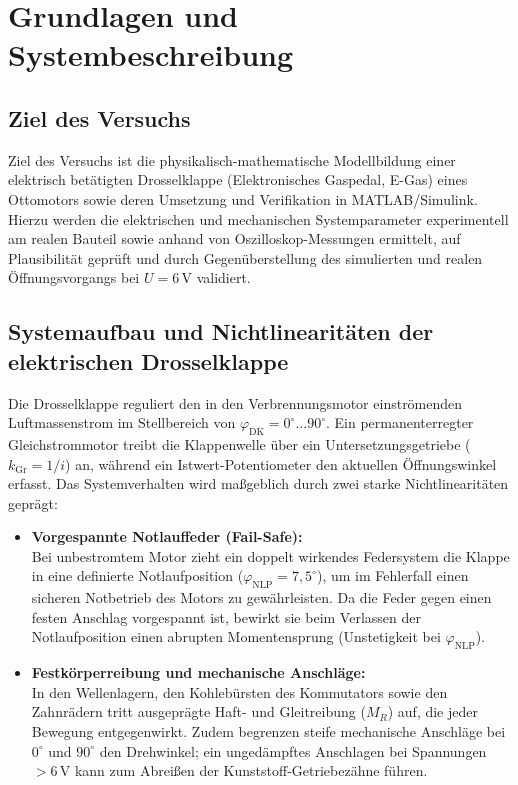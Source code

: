 \documentclass[a4paper,10pt,department=FakEI]{OTHRartcl}
\begin{document}
\vspace{5mm}

\begingroup
\hypersetup{linkcolor=black}
\tableofcontents
\endgroup

\clearpage

\section{Grundlagen und Systembeschreibung}
\subsection{Ziel des Versuchs}
Ziel des Versuchs ist die physikalisch-mathematische Modellbildung einer elektrisch betätigten Drosselklappe (Elektronisches Gaspedal, E-Gas) eines Ottomotors sowie deren Umsetzung und Verifikation in MATLAB/Simulink. Hierzu werden die elektrischen und mechanischen Systemparameter experimentell am realen Bauteil sowie anhand von Oszilloskop-Messungen ermittelt, auf Plausibilität geprüft und durch Gegenüberstellung des simulierten und realen Öffnungsvorgangs bei $U = 6\,\text{V}$ validiert.

\subsection{Systemaufbau und Nichtlinearitäten der elektrischen Drosselklappe}
Die Drosselklappe reguliert den in den Verbrennungsmotor einströmenden Luftmassenstrom im Stellbereich von $\varphi_{\text{DK}} = 0^\circ \dots 90^\circ$. Ein permanenterregter Gleichstrommotor treibt die Klappenwelle über ein Untersetzungsgetriebe ($k_{\text{Gr}} = 1/i$) an, während ein Istwert-Potentiometer den aktuellen Öffnungswinkel erfasst. Das Systemverhalten wird maßgeblich durch zwei starke Nichtlinearitäten geprägt:
\begin{itemize}
    \item \textbf{Vorgespannte Notlauffeder (Fail-Safe):}\\
    Bei unbestromtem Motor zieht ein doppelt wirkendes Federsystem die Klappe in eine definierte Notlaufposition ($\varphi_{\text{NLP}} = 7{,}5^\circ$), um im Fehlerfall einen sicheren Notbetrieb des Motors zu gewährleisten. Da die Feder gegen einen festen Anschlag vorgespannt ist, bewirkt sie beim Verlassen der Notlaufposition einen abrupten Momentensprung (Unstetigkeit bei $\varphi_{\text{NLP}}$).
    \item \textbf{Festkörperreibung und mechanische Anschläge:}\\
    In den Wellenlagern, den Kohlebürsten des Kommutators sowie den Zahnrädern tritt ausgeprägte Haft- und Gleitreibung ($M_R$) auf, die jeder Bewegung entgegenwirkt. Zudem begrenzen steife mechanische Anschläge bei $0^\circ$ und $90^\circ$ den Drehwinkel; ein ungedämpftes Anschlagen bei Spannungen $> 6\,\text{V}$ kann zum Abreißen der Kunststoff-Getriebezähne führen.
\end{itemize}
\end{document}
